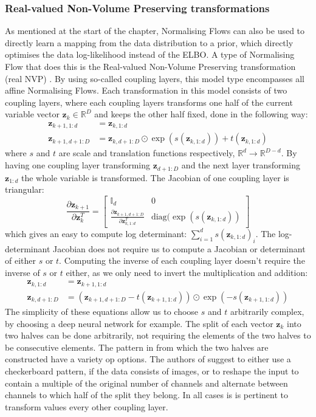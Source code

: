 \documentclass{report}
\newcommand{\eye}{\mathbb{I}}
\newcommand{\R}{\mathbb{R}}
\newcommand{\bz}{\mathbf{z}}
\newcommand{\parfrac}[2]{\frac{\partial #1}{\partial#2}}
\begin{document}
\subsubsection{Real-valued Non-Volume Preserving transformations}
As mentioned at the start of the chapter, Normalising Flows can also be used to directly learn a mapping from the data distribution to a prior, which directly optimises the data log-likelihood instead of the ELBO. A type of Normalising Flow that does this is the Real-valued Non-Volume Preserving transformation (real NVP) \cite{dinh2016density}. By using so-called coupling layers, this model type encompasses all affine Normalising Flows. Each transformation in this model consists of two coupling layers, where each coupling layers transforms one half of the current variable vector $\bz_k \in \R^D$ and keeps the other half fixed, done in the following way:
\begin{align}\label{equation:real_nvp_coupling}
    \bz_{k+1, 1:d} &= \bz_{k, 1:d} \\
    \bz_{k+1, d+1:D} &= \bz_{k, d+1:D} \odot \exp \left(s(\bz_{k, 1:d}) \right) + t(\bz_{k, 1:d})
\end{align}
where $s$ and $t$ are scale and translation functions respectively, $\R^{d} \rightarrow \R^{D-d}$. By having one coupling layer transforming $\bz_{d+1:D}$ and the next layer transforming $\bz_{1:d}$ the whole variable is transformed. The Jacobian of one coupling layer is triangular:
\begin{equation}
    \parfrac{\bz_{k+1}}{\bz_k^T} = \begin{bmatrix}
    \eye_d & 0\\
    \parfrac{\bz_{k+1, d+1:D}}{\bz_{k, 1:d}^T} & \text{diag}(\exp(s(\bz_{k, 1:d}))
    \end{bmatrix}
\end{equation}
which gives an easy to compute log determinant: $\sum\limits^d_{i=1} s(\bz_{k, 1:d})_i$. The log-determinant Jacobian  does not require us to compute a Jacobian or determinant of either $s$ or $t$. Computing the inverse of each coupling layer doesn't require the inverse of $s$ or $t$ either, as we only need to invert the multiplication and addition:
\begin{align}\label{equation:real_nvp_coupling_inverse}
    \bz_{k, 1:d} &= \bz_{k+1, 1:d} \\
    \bz_{k, d+1:D} &= (\bz_{k+1, d+1:D} - t(\bz_{k+1, 1:d})) \odot \exp \left(- s(\bz_{k+1, 1:d}) \right) 
\end{align}
The simplicity of these equations allow us to choose $s$ and $t$ arbitrarily complex, by choosing a deep neural network for example. The split of each vector $\bz_k$ into two halves can be done arbitrarily, not requiring the elements of the two halves to be consecutive elements. The pattern in from which the two halves are constructed have a variety op options. The authors of \cite{dinh2016density} suggest to  either use a checkerboard pattern, if the data consists of images, or to reshape the input to contain a multiple of the original number of channels and alternate between channels to which half of the split they belong. In all cases is is pertinent to transform values every other coupling layer.
\end{document}
